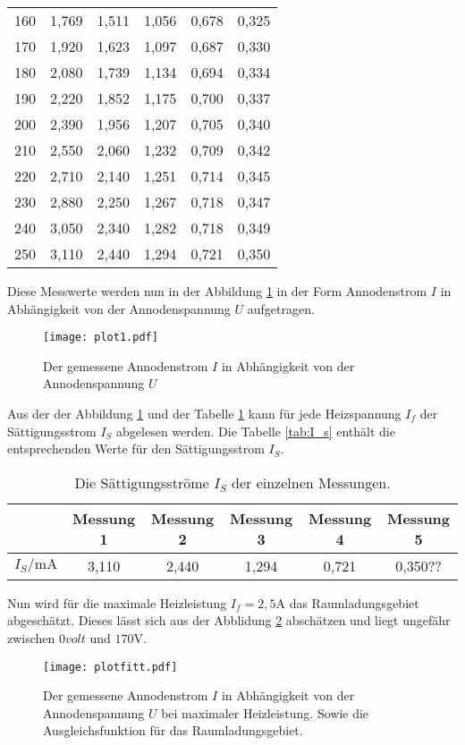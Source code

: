 \begin{table}
\begin{tabular}{c c c c c c}
  160 & 1,769 &  1,511 &  1,056 &  0,678 &  0,325\\
  170 & 1,920 &  1,623 &  1,097 &  0,687 &  0,330\\
  180 & 2,080 &  1,739 &  1,134 &  0,694 &  0,334\\
  190 & 2,220 &  1,852 &  1,175 &  0,700 &  0,337\\
  200 & 2,390 &  1,956 &  1,207 &  0,705 &  0,340\\
  210 & 2,550 &  2,060 &  1,232 &  0,709 &  0,342\\
  220 & 2,710 &  2,140 &  1,251 &  0,714 &  0,345\\
  230 & 2,880 &  2,250 &  1,267 &  0,718 &  0,347\\
  240 & 3,050 &  2,340 &  1,282 &  0,718 &  0,349\\
  250 & 3,110 &  2,440 &  1,294 &  0,721 &  0,350\\
  \bottomrule
 \end{tabular}
\end{table}
\FloatBarrier

Diese Messwerte werden nun in der Abbildung \ref{fig:1} in der Form
Annodenstrom $I$ in Abhängigkeit von der Annodenspannung $U$
aufgetragen.

\begin{figure}
 \centering
 \texttt{[image: plot1.pdf]}
 \caption{Der gemessene Annodenstrom $I$ in Abhängigkeit von der Annodenspannung $U$}
 \label{fig:1}
\end{figure}
\FloatBarrier

Aus der der Abbildung \ref{fig:1} und der Tabelle \ref{tab:1}
kann für jede Heizspannung $I_f$ der
Sättigungsstrom $I_S$ abgelesen werden.
Die Tabelle \ref{tab:I_s} enthält die entsprechenden Werte für den Sättigungsstrom $I_S$.
\begin{table}
  \centering
  \caption{Die Sättigungsströme $I_S$ der einzelnen Messungen.}
  \label{tab:1}
  \begin{tabular}{c c c c c c}
  \toprule
   &  Messung 1 & Messung 2 & Messung 3 & Messung 4 & Messung 5\\ %
   \midrule
  $I_S/\si{\milli\ampere}$ & 3,110 & 2,440  & 1,294 & 0,721 & 0,350?? \\
  \bottomrule
  \end{tabular}
\end{table}
\FloatBarrier

Nun wird für die maximale Heizleistung $I_f=2,5\si{\ampere}$
das Raumladungsgebiet abgeschätzt.
Dieses lässt sich aus der Abblidung \ref{fig:fitt} abschätzen
und liegt ungefähr zwischen $0\si{volt}$ und $170\si{\volt}$.
\begin{figure}
 \centering
 \texttt{[image: plotfitt.pdf]}
 \caption{Der gemessene Annodenstrom $I$ in Abhängigkeit von der Annodenspannung $U$ bei maximaler
Heizleistung. Sowie die Ausgleichsfunktion für das Raumladungsgebiet.}
 \label{fig:fitt}
\end{figure}
\FloatBarrier

